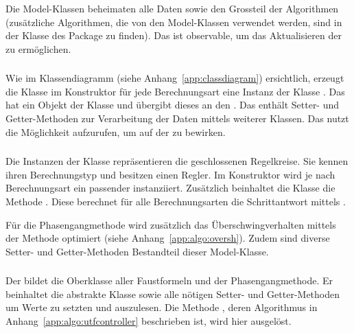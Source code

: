 Die Model-Klassen  beheimaten alle Daten  sowie den Grossteil  der Algorithmen
(zus\"atzliche Algorithmen,  die von den Model-Klassen  verwendet werden, sind
in  der  Klasse    des  Package    zu  finden). Das
  ist   observable,  um  das  Aktualisieren   der    zu
erm\"oglichen.

\subsubsection*{}
Wie  im  Klassendiagramm  (siehe  Anhang~\ref{app:classdiagram})  ersichtlich,
erzeugt  die  Klasse   im  Konstruktor  f\"ur jede  Berechnungsart
eine  Instanz der  Klasse . Das   hat  ein Objekt
der  Klasse   und \"ubergibt  dieses an  den . Das
  enth\"alt  Setter-  und  Getter-Methoden  zur  Verarbeitung  der
Daten  mittels  weiterer  Klassen. Das   nutzt  die  M\"oglichkeit
 aufzurufen, um  auf der  zu
bewirken.


\subsubsection*{}
Die    Instanzen   der    Klasse       repr\"asentieren   die
geschlossenen  Regelkreise. Sie  kennen   ihren  Berechnungstyp  und  besitzen
einen  Regler. Im  Konstruktor  wird  je  nach  Berechnungsart  ein  passender
   instanziiert. Zus\"atzlich  beinhaltet   die  Klasse   die
Methode  . Diese   berechnet  f\"ur   alle  Berechnungsarten
die    Schrittantwort    mittels   .

F\"ur  die  Phasengangmethode  wird  zus\"atzlich  das  \"Uberschwingverhalten
mittels   der   Methode       optimiert   (siehe
Anhang~\ref{app:algo:oversh}).  Zudem sind diverse Setter- und Getter-Methoden
Bestandteil dieser Model-Klasse.


\subsubsection*{}
Der    bildet  die  Oberklasse  aller  Faustformeln  und  der
Phasengangmethode. Er  beinhaltet  die   abstrakte  Klasse  
sowie  alle  n\"otigen  Setter-  und   Getter-Methoden  um  Werte  zu  setzten
und  auszulesen.  Die  Methode  ,  deren Algorithmus  in
Anhang~\ref{app:algo:utfcontroller} beschrieben ist, wird hier ausgel\"ost.



